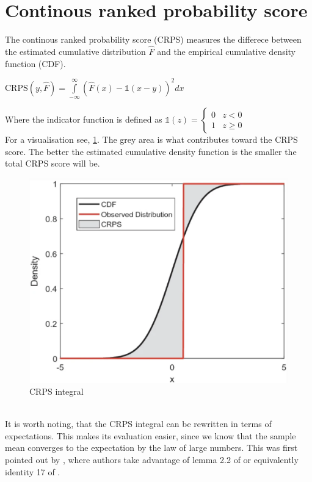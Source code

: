 \section{Continous ranked probability score}
The continous ranked probability score (CRPS) measures the differece between the estimated cumulative distribution $\hat{F}$ and the empirical cumulative density function (CDF).
\begin{definition}\label{def_crps}
    $\mathrm{CRPS}(y, \hat{F})=\int\limits_{-\infty}^{\infty}\left(\hat{F}(x)-\mathbb{1}(x-y) \right)^2 dx$
\end{definition}
Where the indicator function is defined as 
    $\mathbb{1}(z)=
\begin{cases}
0 & z<0\\
1 & z \geq 0
\end{cases}$
\\
For a visualisation see, \ref{fig:crps}. The grey area is what contributes toward the CRPS score.
The better the estimated cumulative density function is the smaller the total CRPS score will be.
\begin{figure}
    \includegraphics[width=\textwidth]{images/crps.png}
    \caption{CRPS integral \cite{haben2023core}}
    \label{fig:crps}
  \end{figure}
  \\
It is worth noting, that the CRPS integral can be rewritten in terms of expectations. This makes its evaluation easier, since we know that the sample mean converges to the expectation by the law of large numbers. This was first pointed out by \cite{proper_scores}, where authors take advantage of lemma 2.2 of \cite{new_multi_test2} or equivalently identity 17 of \cite{new_multi_tes1}.
